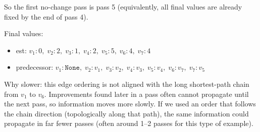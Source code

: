 \begin{prob}
\begin{soln}
        So the first no-change pass is pass 5 (equivalently, all final values are already fixed by the end of pass 4).

        Final values:
        \begin{itemize}
            \item est: $v_1\!:\!0,\; v_2\!:\!2,\; v_3\!:\!1,\; v_4\!:\!2,\; v_5\!:\!5,\; v_6\!:\!4,\; v_7\!:\!4$
            \item predecessor: $v_1\!:\!\texttt{None},\; v_2\!:\!v_1,\; v_3\!:\!v_2,\; v_4\!:\!v_3,\; v_5\!:\!v_4,\; v_6\!:\!v_7,\; v_7\!:\!v_5$
        \end{itemize}

        Why slower: this edge ordering is not aligned with the long shortest-path chain from $v_1$ to $v_6$.
        Improvements found later in a pass often cannot propagate until the next pass, so information moves more slowly.
        If we used an order that follows the chain direction (topologically along that path), the same information could propagate in far fewer passes (often around 1--2 passes for this type of example).
    \end{soln}
\end{prob}
